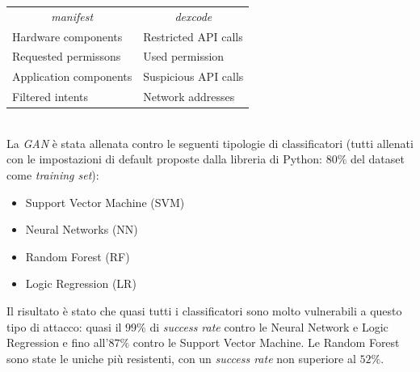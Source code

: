 \begin{center}
    \begin{tabular}{ll}
    \cline{1-2}
    \multicolumn{1}{c}{\textit{manifest}} & \multicolumn{1}{c}{\textit{dexcode}} \\
    \cline{1-2} 
        Hardware components & Restricted API calls\\ [0.5ex]
        Requested permissons & Used permission  \\ [0.5ex]
        Application components & Suspicious API calls \\ [0.5ex]
        Filtered intents & Network addresses \\ [0.5ex]
    \cline{1-2}
    \end{tabular}
\end{center}
\ \\
La \textit{GAN} è stata allenata contro le seguenti tipologie di classificatori (tutti allenati con le impostazioni di default proposte dalla libreria  di Python: \(80\%\) del dataset come \textit{training set}):

\begin{itemize}
    \item Support Vector Machine (SVM)
    \item Neural Networks (NN)
    \item Random Forest (RF)
    \item Logic Regression (LR)
\end{itemize}

Il risultato è stato che quasi tutti i classificatori sono molto vulnerabili a questo tipo di attacco: quasi il \(99 \%\) di \textit{success rate} contro le Neural Network e Logic Regression e fino all'\(87 \%\) contro le Support Vector Machine. Le Random Forest sono state le uniche più resistenti, con un \textit{success rate} non superiore al \(52 \%\).

